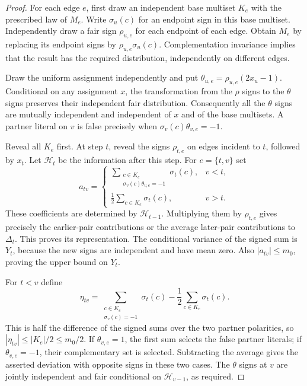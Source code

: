 \documentclass[11pt,a4paper]{article}
\theoremstyle{definition}
\theoremstyle{remark}
\begin{document}
\begin{proof}
For each edge $e$, first draw an independent base multiset $K_e$ with
the prescribed law of $M_e$. Write $\sigma_u(c)$ for an endpoint sign
in this base multiset. Independently draw a fair sign $\rho_{u,e}$ for
each endpoint of each edge. Obtain $M_e$ by replacing its endpoint signs
by $\rho_{u,e}\sigma_u(c)$. Complementation invariance implies that the
result has the required distribution, independently on different edges.

Draw the uniform assignment independently and put
$\theta_{u,e}=\rho_{u,e}(2x_u-1)$. Conditional on any assignment $x$,
the transformation from the $\rho$ signs to the $\theta$ signs preserves
their independent fair distribution. Consequently all the $\theta$ signs
are mutually independent and independent of $x$ and of the base multisets.
A partner literal on $v$ is false precisely when
$\sigma_v(c)\theta_{v,e}=-1$.

Reveal all $K_e$ first. At step $t$, reveal the signs $\rho_{t,e}$ on
edges incident to $t$, followed by $x_t$. Let $\mathcal H_t$ be the
information after this step. For $e=\{t,v\}$ set
\[
 a_{tv}=
 \begin{cases}
 \displaystyle\sum_{\substack{c\in K_e\\
                    \sigma_v(c)\theta_{v,e}=-1}}\sigma_t(c),&v<t,\\[6pt]
 \displaystyle\frac12\sum_{c\in K_e}\sigma_t(c),&v>t.
 \end{cases}
\]
These coefficients are determined by $\mathcal H_{t-1}$. Multiplying
them by $\rho_{t,e}$ gives precisely the earlier-pair contributions or
the average later-pair contributions to $\Delta_t$. This proves its
representation. The conditional variance of the signed sum is $Y_t$,
because the new signs are independent and have mean zero. Also
$|a_{tv}|\le m_0$, proving the upper bound on $Y_t$.

For $t<v$ define
\[
 \eta_{tv}=
 \sum_{\substack{c\in K_e\\\sigma_v(c)=-1}}\sigma_t(c)
       -\frac12\sum_{c\in K_e}\sigma_t(c).
\]
This is half the difference of the signed sums over the two partner
polarities, so $|\eta_{tv}|\le |K_e|/2\le m_0/2$.
If $\theta_{v,e}=1$, the first sum selects the false partner literals;
if $\theta_{v,e}=-1$, their complementary set is selected.
Subtracting the average gives the asserted deviation with opposite signs
in these two cases. The $\theta$ signs at $v$ are jointly independent
and fair conditional on $\mathcal H_{v-1}$, as required.
\end{proof}
\end{document}
